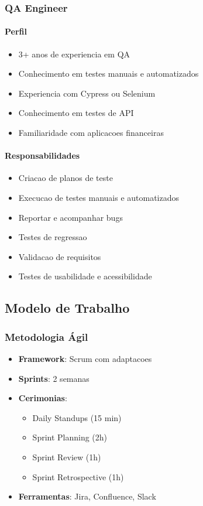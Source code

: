 \subsubsection{QA Engineer}
\paragraph{Perfil}
\begin{itemize}
    \item 3+ anos de experiencia em QA
    \item Conhecimento em testes manuais e automatizados
    \item Experiencia com Cypress ou Selenium
    \item Conhecimento em testes de API
    \item Familiaridade com aplicacoes financeiras
\end{itemize}

\paragraph{Responsabilidades}
\begin{itemize}
    \item Criacao de planos de teste
    \item Execucao de testes manuais e automatizados
    \item Reportar e acompanhar bugs
    \item Testes de regressao
    \item Validacao de requisitos
    \item Testes de usabilidade e acessibilidade
\end{itemize}

\subsection{Modelo de Trabalho}

\subsubsection{Metodologia Ágil}
\begin{itemize}
    \item \textbf{Framework}: Scrum com adaptacoes
    \item \textbf{Sprints}: 2 semanas
    \item \textbf{Cerimonias}:
    \begin{itemize}
        \item Daily Standups (15 min)
        \item Sprint Planning (2h)
        \item Sprint Review (1h)
        \item Sprint Retrospective (1h)
    \end{itemize}
    \item \textbf{Ferramentas}: Jira, Confluence, Slack
\end{itemize}

